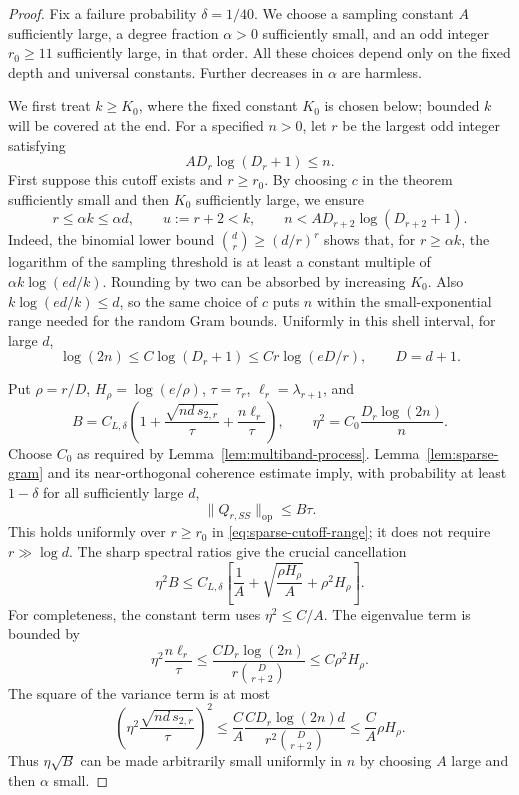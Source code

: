 \begin{proof}
Fix a failure probability $\delta=1/40$. We choose a sampling constant
$A$ sufficiently large, a degree fraction $\alpha>0$ sufficiently small,
and an odd integer $r_0\ge11$ sufficiently large, in that order.
All these choices depend only on the fixed depth and universal constants.
Further decreases in $\alpha$ are harmless.

We first treat $k\ge K_0$, where the fixed constant $K_0$ is chosen
below; bounded $k$ will be covered at the end.
For a specified $n>0$, let $r$ be the largest odd integer satisfying
\begin{equation}\label{eq:sparse-coarse-cutoff}
 A D_r\log(D_r+1)\le n.
\end{equation}
First suppose this cutoff exists and $r\ge r_0$. By choosing $c$ in the
theorem sufficiently small and then $K_0$ sufficiently large, we ensure
\begin{equation}\label{eq:sparse-cutoff-range}
 r\le\alpha k\le\alpha d,\qquad u:=r+2<k,
 \qquad n<A D_{r+2}\log(D_{r+2}+1).
\end{equation}
Indeed, the binomial lower bound
$\binom dr\ge(d/r)^r$ shows that, for $r\ge\alpha k$, the logarithm
of the sampling threshold is at least a constant multiple of
$\alpha k\log(ed/k)$. Rounding by two can be absorbed by increasing
$K_0$. Also $k\log(ed/k)\le d$, so the same choice of $c$ puts $n$
within the small-exponential range needed for the random Gram bounds.
Uniformly in this shell interval, for large $d$,
\[
 \log(2n)\le C\log(D_r+1)\le C r\log(eD/r),\qquad D=d+1.
\]

Put $\rho=r/D$, $H_\rho=\log(e/\rho)$, $\tau=\tau_r$,
$\ell_r=\lambda_{r+1}$, and
\[
 B=C_{L,\delta}\left(1+
             \frac{\sqrt{nd\,s_{2,r}}}{\tau}
             +\frac{n\ell_r}{\tau}\right),
 \qquad \eta^2=C_0\frac{D_r\log(2n)}n.
\]
Choose $C_0$ as required by Lemma~\ref{lem:multiband-process}.
Lemma~\ref{lem:sparse-gram} and its near-orthogonal coherence estimate
imply, with probability at least $1-\delta$ for all sufficiently large
$d$,
\begin{equation}\label{eq:sparse-low-gram}
 \|Q_{r,SS}\|_{\mathrm{op}}\le B\tau.
\end{equation}
This holds uniformly over $r\ge r_0$ in
\eqref{eq:sparse-cutoff-range}; it does not require $r\gg\log d$.
The sharp spectral ratios give the crucial cancellation
\begin{equation}\label{eq:sparse-variable-accuracy}
 \eta^2B\le C_{L,\delta}\left[
      \frac1A+\sqrt{\frac{\rho H_\rho}{A}}+
                     \rho^2H_\rho\right].
\end{equation}
For completeness, the constant term uses $\eta^2\le C/A$.
The eigenvalue term is bounded by
\[
 \eta^2\frac{n\ell_r}{\tau}
 \le\frac{C D_r\log(2n)}{r\binom D{r+2}}
 \le C\rho^2H_\rho.
\]
The square of the variance term is at most
\[
 \left(\eta^2\frac{\sqrt{nd\,s_{2,r}}}{\tau}\right)^2
 \le\frac CA\frac{C D_r\log(2n)d}{r^2\binom D{r+2}}
 \le\frac CA\rho H_\rho.
\]
Thus $\eta\sqrt B$ can be made arbitrarily small uniformly in $n$
by choosing $A$ large and then $\alpha$ small.


\end{proof}

